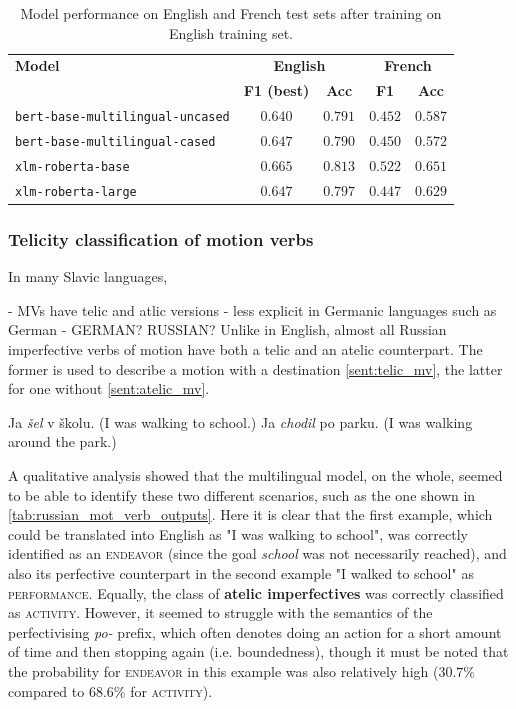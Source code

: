 \begin{table}[h!]
    \centering
    \begin{tabular}{lcccc}
    \toprule
    \textbf{Model} & \multicolumn{2}{c}{\textbf{English}} & \multicolumn{2}{c}{\textbf{French}} \\
    \cmidrule(r){2-3} \cmidrule(r){4-5}
     & \textbf{F1 (best)} & \textbf{Acc} & \textbf{F1} & \textbf{Acc} \\
    \midrule
    \texttt{bert-base-multilingual-uncased} & $0.640$ & $0.791$ & $0.452$ & $0.587$ \\
    \texttt{bert-base-multilingual-cased}   & $0.647$ & $0.790$ & $0.450$ & $0.572$ \\
    \texttt{xlm-roberta-base}               & $\mathbf{0.665}$ & $\mathbf{0.813}$ & $\mathbf{0.522}$ & $\mathbf{0.651}$ \\
    \texttt{xlm-roberta-large}              & $0.647$ & $0.797$ & $0.447$ & $0.629$ \\
    \bottomrule
    \end{tabular}
    \caption{Model performance on English and French test sets after training on English training set.}
    \label{tab:performance}
\end{table}

\subsubsection{Telicity classification of motion verbs}
In many Slavic languages, 

- MVs have telic and atlic versions
- less explicit in Germanic languages such as German
- 
GERMAN? RUSSIAN?
Unlike in English, almost all Russian imperfective verbs of motion have both a telic and an atelic counterpart. The former is used to describe a motion with a destination \ref{sent:telic_mv}, the latter for one without \ref{sent:atelic_mv}.

\begin{exe}
    \ex Ja \emph{šel} v školu. (I was walking to school.)
    \label{sent:telic_mv}
    \ex Ja \emph{chodil} po parku. (I was walking around the park.)
    \label{sent:atelic_mv}
\end{exe}

A qualitative analysis showed that the multilingual model, on the whole, seemed to be able to identify these two different scenarios, such as the one shown in \ref{tab:russian_mot_verb_outputs}. Here it is clear that the first example, which could be translated into English as "I was walking to school", was correctly identified as an \textsc{endeavor} (since the goal \emph{school} was not necessarily reached), and also its perfective counterpart in the second example "I walked to school" as \textsc{performance}. Equally, the class of \textbf{atelic imperfectives} was correctly classified as \textsc{activity}. However, it seemed to struggle with the semantics of the perfectivising \emph{po-} prefix, which often denotes doing an action for a short amount of time and then stopping again (i.e. boundedness), though it must be noted that the probability for \textsc{endeavor} in this example was also relatively high ($30.7\%$ compared to $68.6\%$ for \textsc{activity}).

